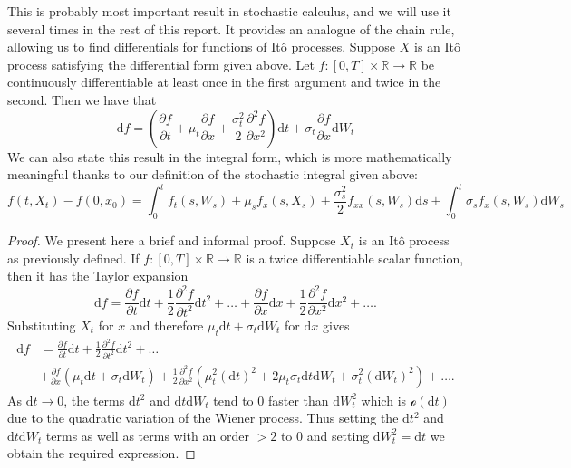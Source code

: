 \begin{lemma}[It\^{o}'s Lemma]
    This is probably most important result in stochastic calculus, and we will use 
    it several times in the rest of this report. It provides an analogue of the 
    chain rule, allowing us to find differentials for functions of It\^{o} processes. 
    Suppose $X$ is an It\^{o} process satisfying the differential form given above. 
    Let $f:[0,T]\times\mathbb{R}\rightarrow\mathbb{R}$ be continuously differentiable 
    at least once in the first argument and twice in the second. Then we have that
    \begin{equation}\label{eq:1.25}
        \mathrm df=\left(\frac{\partial f}{\partial t}+\mu_t\frac{\partial f}{\partial x}+\frac{\sigma_t^2}{2}\frac{\partial^2 f}{\partial x^2}\right)\mathrm dt + \sigma_t\frac{\partial f}{\partial x}\mathrm dW_t
    \end{equation}
    We can also state this result in the integral form, which is more mathematically 
    meaningful thanks to our definition of the stochastic integral given above:
    \begin{equation}\label{eq:1.26}
        f(t,X_t)-f(0,x_0)=\int_0^tf_t(s,W_s)+\mu_sf_x(s,X_s)+\frac{\sigma_s^2}{2}f_{xx}(s,W_s)\mathrm ds+\int_0^t\sigma_sf_x(s,W_s)\mathrm dW_s
    \end{equation}
\end{lemma}
\begin{proof}
    We present here a brief and informal proof. Suppose $X_t$ is an It\^{o} process
    as previously defined. If $f:[0,T]\times\mathbb{R}\rightarrow\mathbb{R}$ is a 
    twice differentiable scalar function, then it has the Taylor expansion
    \begin{equation}
        \mathrm df = \frac{\partial f}{\partial t}\mathrm dt+\frac{1}{2}\frac{\partial^2f}{\partial t^2}\mathrm dt^2+\dots+\frac{\partial f}{\partial x}\mathrm dx+\frac{1}{2}\frac{\partial^2f}{\partial x^2}\mathrm dx^2+\dots.
    \end{equation}
    Substituting $X_t$ for $x$ and therefore $\mu_t\mathrm dt + \sigma_t\mathrm dW_t$
    for $\mathrm dx$ gives
    \begin{align*}
        \mathrm df &= \frac{\partial f}{\partial t}\mathrm dt+\frac{1}{2}\frac{\partial^2f}{\partial t^2}\mathrm dt^2+\dots\\
        &+\frac{\partial f}{\partial x}(\mu_t\mathrm dt + \sigma_t\mathrm dW_t)+\frac{1}{2}\frac{\partial^2f}{\partial x^2}(\mu_t^2(\mathrm dt)^2 + 2\mu_t\sigma_t\mathrm dt\mathrm dW_t+ \sigma_t^2(\mathrm dW_t)^2)+\dots.
    \end{align*}
    As $\mathrm dt\rightarrow0$, the terms $\mathrm dt^2$ and $\mathrm dt\mathrm dW_t$ 
    tend to 0 faster than $\mathrm dW_t^2$ which is $\mathcal{o}(\mathrm dt)$ due to
    the quadratic variation of the Wiener process. Thus setting the $\mathrm dt^2$ 
    and $\mathrm dt\mathrm dW_t$ terms as well as terms with an order $>2$ to 0
    and setting $\mathrm dW_t^2=\mathrm dt$ we obtain the required expression.
\end{proof}

